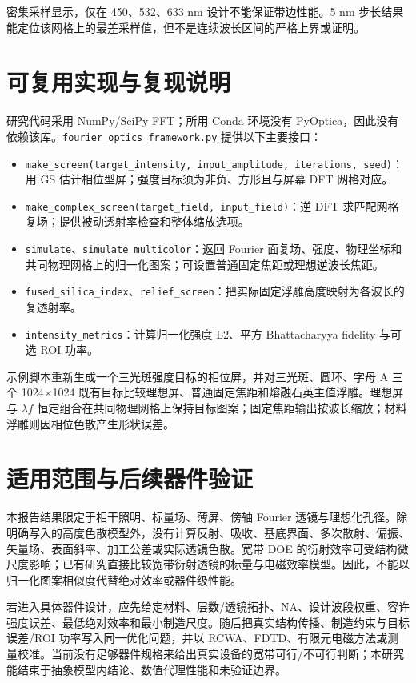 \documentclass[UTF8,a4paper,11pt,fontset=fandol]{ctexart}
\begin{document}
密集采样显示，仅在 450、532、633 nm 设计不能保证带边性能。5 nm 步长结果能定位该网格上的最差采样值，但不是连续波长区间的严格上界或证明。

\section{可复用实现与复现说明}

研究代码采用 NumPy/SciPy FFT；所用 Conda 环境没有 PyOptica，因此没有依赖该库。\texttt{fourier\_optics\_framework.py} 提供以下主要接口：
\begin{itemize}
  \item \texttt{make\_screen(target\_intensity, input\_amplitude, iterations, seed)}：用 GS 估计相位型屏；强度目标须为非负、方形且与屏幕 DFT 网格对应。
  \item \texttt{make\_complex\_screen(target\_field, input\_field)}：逆 DFT 求匹配网格复场；提供被动透射率检查和整体缩放选项。
  \item \texttt{simulate}、\texttt{simulate\_multicolor}：返回 Fourier 面复场、强度、物理坐标和共同物理网格上的归一化图案；可设置普通固定焦距或理想逆波长焦距。
  \item \texttt{fused\_silica\_index}、\texttt{relief\_screen}：把实际固定浮雕高度映射为各波长的复透射率。
  \item \texttt{intensity\_metrics}：计算归一化强度 L2、平方 Bhattacharyya fidelity 与可选 ROI 功率。
\end{itemize}

示例脚本重新生成一个三光斑强度目标的相位屏，并对三光斑、圆环、字母 A 三个 1024$\times$1024 既有目标比较理想屏、普通固定焦距和熔融石英主值浮雕。理想屏与 $\lambda f$ 恒定组合在共同物理网格上保持目标图案；固定焦距输出按波长缩放；材料浮雕则因相位色散产生形状误差。

\section{适用范围与后续器件验证}

本报告结果限定于相干照明、标量场、薄屏、傍轴 Fourier 透镜与理想化孔径。除明确写入的高度色散模型外，没有计算反射、吸收、基底界面、多次散射、偏振、矢量场、表面斜率、加工公差或实际透镜色散。宽带 DOE 的衍射效率可受结构微尺度影响；已有研究直接比较宽带衍射透镜的标量与电磁效率模型\cite{greisukh}。因此，不能以归一化图案相似度代替绝对效率或器件级性能。

若进入具体器件设计，应先给定材料、层数/透镜拓扑、NA、设计波段权重、容许强度误差、最低绝对效率和最小制造尺度。随后把真实结构传播、制造约束与目标误差/ROI 功率写入同一优化问题，并以 RCWA、FDTD、有限元电磁方法或测量校准。当前没有足够器件规格来给出真实设备的宽带可行/不可行判断；本研究能结束于抽象模型内结论、数值代理性能和未验证边界。
\end{document}
